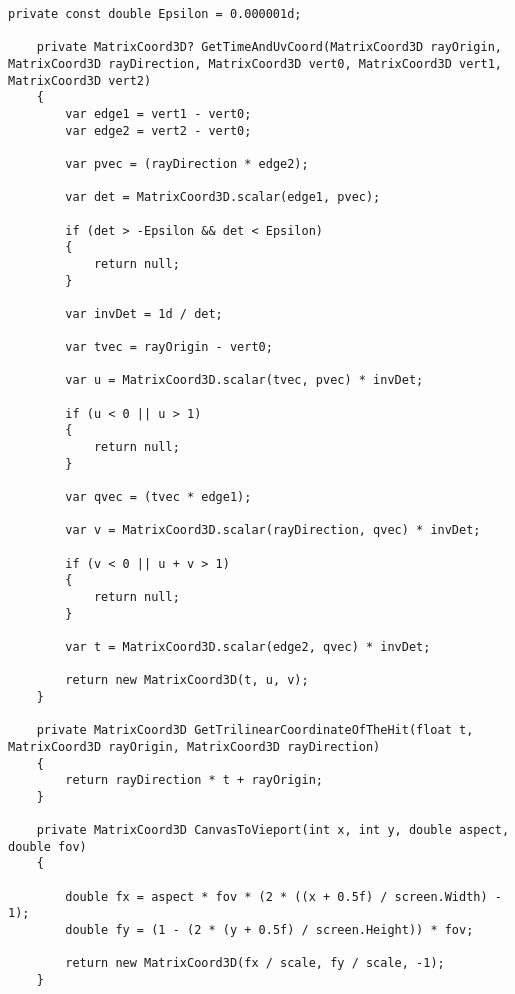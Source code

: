 \begin{center}
\begin{lstlisting}[label=common_part, caption={Реализация общей части трассировки лучей}]
	private const double Epsilon = 0.000001d;
	
	private MatrixCoord3D? GetTimeAndUvCoord(MatrixCoord3D rayOrigin, MatrixCoord3D rayDirection, MatrixCoord3D vert0, MatrixCoord3D vert1, MatrixCoord3D vert2)
	{
		var edge1 = vert1 - vert0;
		var edge2 = vert2 - vert0;
		
		var pvec = (rayDirection * edge2);
		
		var det = MatrixCoord3D.scalar(edge1, pvec);
		
		if (det > -Epsilon && det < Epsilon)
		{
			return null;
		}
		
		var invDet = 1d / det;
		
		var tvec = rayOrigin - vert0;
		
		var u = MatrixCoord3D.scalar(tvec, pvec) * invDet;
		
		if (u < 0 || u > 1)
		{
			return null;
		}
		
		var qvec = (tvec * edge1);
		
		var v = MatrixCoord3D.scalar(rayDirection, qvec) * invDet;
		
		if (v < 0 || u + v > 1)
		{
			return null;
		}
		
		var t = MatrixCoord3D.scalar(edge2, qvec) * invDet;
		
		return new MatrixCoord3D(t, u, v);
	}
	
	private MatrixCoord3D GetTrilinearCoordinateOfTheHit(float t, MatrixCoord3D rayOrigin, MatrixCoord3D rayDirection)
	{
		return rayDirection * t + rayOrigin;
	}
	
	private MatrixCoord3D CanvasToVieport(int x, int y, double aspect, double fov)
	{
		
		double fx = aspect * fov * (2 * ((x + 0.5f) / screen.Width) - 1);
		double fy = (1 - (2 * (y + 0.5f) / screen.Height)) * fov;
		
		return new MatrixCoord3D(fx / scale, fy / scale, -1);
	}
\end{lstlisting}
\end{center}
\newpage
